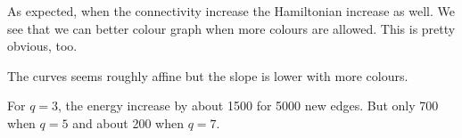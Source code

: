 \documentclass[a4paper, 11pt]{article}
\begin{document}
As expected, when the connectivity increase the Hamiltonian increase as well. We see that we can better colour graph when more colours are allowed. This is pretty obvious, too.

The curves seems roughly affine but the slope is lower with more colours.

For $q=3$, the energy increase by about 1500 for 5000 new edges. But only 700 when $q=5$ and about 200 when $q=7$.


\FloatBarrier



\end{document}
